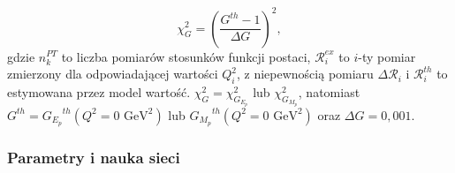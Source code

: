 \documentclass[11pt]{book}
\theoremstyle{definition}
\begin{document}
\begin{equation}
\chi_{G}^2 =  \left( \frac{G^{th} - 1}{\Delta G} \right)^2, \label{eq_ge_gm}
\end{equation}
%
gdzie $n_k^{PT}$ to liczba pomiarów stosunków funkcji postaci, $\mathcal{R}_i^{ex}$ to $i$-ty pomiar zmierzony dla odpowiadającej wartości $Q_i^2$, z niepewnością pomiaru $\Delta \mathcal{R}_{i}$ i $\mathcal{R}_i^{th}$ to estymowana przez model wartość. $\chi_{G}^2 = \chi_{G_{E_p}}^2$ lub $\chi_{G_{M_p}}^2 $, natomiast $G^{th} = {G_{E_p}}^{th}\left(Q^2=0\text{ GeV}^2\right)$ lub ${G_{M_p}}^{th}\left(Q^2=0\text{ GeV}^2\right)$ oraz $\Delta {G} = 0,001$.

\subsubsection{Parametry i nauka sieci}
\end{document}
